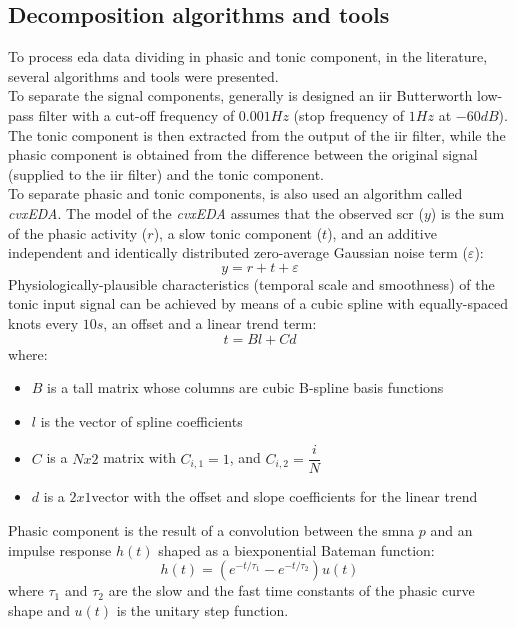 \subsection{Decomposition algorithms and tools}
To process \gls{eda} data dividing in phasic and tonic component, in the literature, several algorithms and tools were presented.
\\ \indent
To separate the signal components, generally is designed an \gls{iir} Butterworth low-pass filter with a cut-off frequency of $0.001Hz$ (stop frequency of $1Hz$ at $-60dB$). The tonic component is then extracted from the output of the \gls{iir} filter, while the phasic component is obtained from the difference between the original signal (supplied to the \gls{iir} filter) and the tonic component.
\\ \indent
To separate phasic and tonic components, is also used an algorithm called \textit{cvxEDA}. The model of the \textit{cvxEDA} assumes that the observed \gls{scr} ($y$) is the sum of the phasic activity ($r$), a slow tonic component ($t$), and an additive independent and identically distributed zero-average Gaussian noise term ($\varepsilon$):
\begin{equation}
	y=r+t+\varepsilon
\end{equation}
Physiologically-plausible characteristics (temporal scale and smoothness) of the tonic input signal can be achieved by means of a cubic spline with equally-spaced knots every $10s$, an offset and a linear trend term:
\begin{equation}
	\label{eq:tonic_model}
	t=Bl+Cd
\end{equation}
where:
\begin{itemize}
	\item $B$ is a tall matrix whose columns are cubic B-spline basis functions
	\item $l$ is the vector of spline coefficients
	\item $C$ is a $Nx2$ matrix with $C_{i,1} = 1$, and $C_{i,2} = \dfrac{i}{N}$
	\item $d$ is a $2x1$vector with the offset and slope coefficients for the linear trend
\end{itemize}
Phasic component is the result of a convolution between the \gls{smna} $p$ and an impulse response $h(t)$ shaped as a biexponential Bateman function:
\begin{equation}
	h(t)=(e^{-t/\tau_1}-e^{-t/\tau_2})u(t)
\end{equation}
where $\tau_1$ and $\tau_2$ are the slow and the fast time constants of the phasic curve shape and $u(t)$ is the unitary step function.
